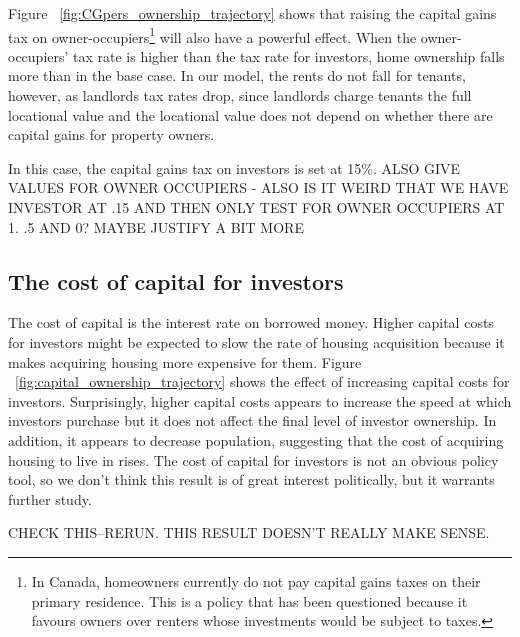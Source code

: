Figure ~\ref{fig:CGpers_ownership_trajectory} shows that raising the capital gains tax on owner-occupiers\footnote{In Canada, homeowners currently do not pay capital gains taxes on their primary residence. This is a policy that has been questioned because it favours owners over renters whose investments would be subject to taxes.}  will also have a powerful effect. When the owner-occupiers' tax rate is higher than the tax rate for investors, %
home ownership falls more than in the base case. In our model, the rents do not fall for tenants, however, as landlords tax rates drop, since landlords charge tenants the full locational value and the locational value does not depend on whether there are capital gains for property owners. 

In this case, the capital gains tax on investors is set at 15\%. {\color{red} ALSO GIVE VALUES FOR OWNER OCCUPIERS - ALSO IS IT WEIRD THAT WE HAVE INVESTOR AT .15 AND THEN ONLY TEST FOR OWNER OCCUPIERS AT 1. .5 AND 0? MAYBE JUSTIFY A BIT MORE}
 




\subsection{The cost of capital for investors}

The cost of capital is the interest rate on borrowed money. Higher capital costs for investors might be expected to slow the rate of housing acquisition because it makes acquiring housing more expensive for them. Figure ~\ref{fig:capital_ownership_trajectory} shows the effect of increasing capital costs for investors. Surprisingly, higher capital costs appears to increase the speed at which investors purchase but it does not affect the final level of investor ownership.  In addition, it appears to decrease population, suggesting that the cost of acquiring housing to live in rises. The cost of capital for investors is not an obvious policy tool, so we don't think this result is of great interest politically, but it warrants further study.

{\color{red} CHECK THIS--RERUN. THIS RESULT DOESN'T REALLY MAKE SENSE.}

